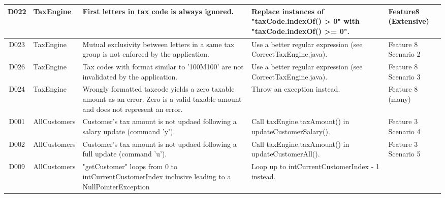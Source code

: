 \begin{table}[H]
\begin{tabularx}{\textwidth}{| c | P | X | X | P |}
D022 
& TaxEngine 
& First letters in tax code is always ignored.   
& Replace instances of "taxCode.indexOf() > 0" with "taxCode.indexOf() >= 0".
&  Feature8 (Extensive) \\%
\hline %
D023 
& TaxEngine 
& Mutual exclusivity between letters in a same tax group is not enforced by the application.
& Use a better regular expression (see CorrectTaxEngine.java).
& Feature 8 Scenario 2 \\
\hline %
D026 
& TaxEngine 
& Tax codes with format similar to '100M100' are not invalidated by the application.
& Use a better regular expression (see CorrectTaxEngine.java). 
& Feature 8 Scenario 3 \\
\hline %
D024 
& TaxEngine 
& Wrongly formatted taxcode yields a zero taxable amount as an error. Zero is a valid taxable amount and does not represent an error. 
& Throw an exception instead.
& Feature 8 (many)\\
\hline %
D001 
& AllCustomers 
& Customer's tax amount is not updaed following a salary update (command 'y'). 
& Call taxEngine.taxAmount() in updateCustomerSalary(). 
& Feature 3 Scenario 4 \\
\hline %
D002 
& AllCustomers 
& Customer's tax amount is not updaed following a full update (command 'u').
& Call taxEngine.taxAmount() in updateCustomerAll(). 
& Feature 3 Scenario 5\\
\hline %
D009 
& AllCustomers 
& "getCustomer" loops from 0 to intCurrentCustomerIndex inclusive leading to a NullPointerException
& Loop up to intCurrentCustomerIndex - 1 instead.

\end{tabularx}
\end{table}
